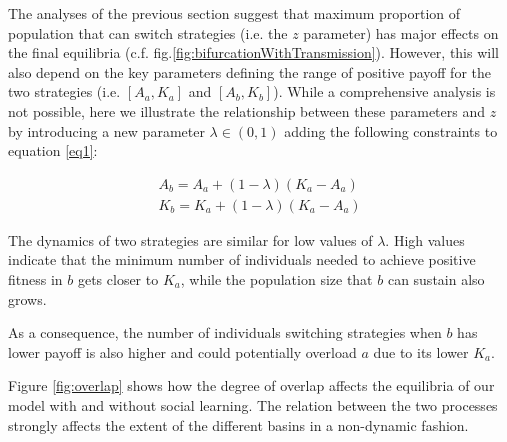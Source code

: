 \documentclass[3p,authoryear,twocolumn]{elsarticle} %
\begin{document}
The analyses of the previous section suggest that maximum proportion of population that can switch strategies (i.e. the $z$ parameter) has major effects on the final equilibria (c.f. fig.\ref{fig:bifurcationWithTransmission}). However, this will also depend on the key parameters defining the range of positive payoff for the two strategies (i.e. $[A_a,K_a]$ and $[A_b,K_b]$). While a comprehensive analysis is not possible, here we illustrate the relationship between these parameters and $z$ by introducing a new parameter $\lambda \in (0,1)$ adding the following constraints to equation \eqref{eq1}: 

\begin{equation}
\begin{aligned}
\label{eqOverlap}
A_b = A_a + (1-\lambda)(K_a-A_a)\\
K_b = K_a + (1-\lambda)(K_a-A_a)
\end{aligned}
\end{equation}

The dynamics of two strategies are similar for low values of $\lambda$. High values indicate that the minimum number of individuals needed to achieve positive fitness in $b$ gets closer to $K_a$, while the population size that $b$ can sustain also grows. 

As a consequence, the number of individuals switching strategies when $b$ has lower payoff is also higher and could potentially overload $a$ due to its lower $K_a$.

Figure \ref{fig:overlap} shows how the degree of overlap affects the equilibria of our model with and without social learning. The relation between the two processes strongly affects the extent of the different basins in a non-dynamic fashion.


\end{document}
